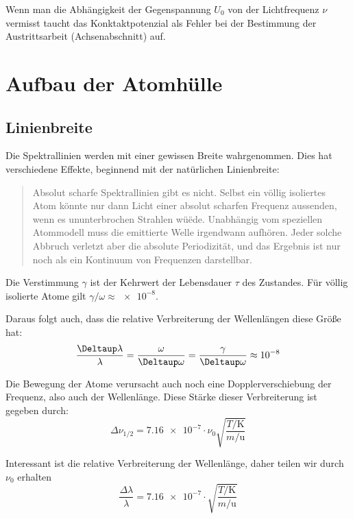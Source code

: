 Wenn man die Abhängigkeit der Gegenspannung $U_0$ von der Lichtfrequenz $\nu$
vermisst taucht das Konktaktpotenzial als Fehler bei der Bestimmung der
Austrittsarbeit (Achsenabschnitt) auf.

\section{Aufbau der Atomhülle}

\subsection{Linienbreite}

Die Spektrallinien werden mit einer gewissen Breite wahrgenommen. Dies hat
verschiedene Effekte, beginnend mit der natürlichen Linienbreite:

\begin{quote}
    Absolut scharfe Spektrallinien gibt es nicht. Selbst ein völlig isoliertes
    Atom könnte nur dann Licht einer absolut scharfen Frequenz aussenden, wenn
    es ununterbrochen Strahlen wüëde. Unabhängig vom speziellen Atommodell muss
    die emittierte Welle irgendwann aufhören. Jeder solche Abbruch verletzt
    aber die absolute Periodizität, und das Ergebnis ist nur noch als ein
    Kontinuum von Frequenzen darstellbar.
    \parencite[Abschnitt~14.3.2]{meschede-gerthsen_24}
\end{quote}

Die Verstimmung $\gamma$ ist der Kehrwert der Lebensdauer $\tau$ des Zustandes.
Für völlig isolierte Atome gilt $\gamma / \omega \approx \num{e-8}$.
\parencite[Abschnitt~14.3.2]{meschede-gerthsen_24}

Daraus folgt auch, dass die relative Verbreiterung der Wellenlängen diese Größe
hat:
\[
    \frac{\Deltaup \lambda}{\lambda}
    = \frac{\omega}{\Deltaup \omega}
    = \frac{\gamma}{\Deltaup \omega}
    \approx \num{e-8}
\]

Die Bewegung der Atome verursacht auch noch eine Dopplerverschiebung der
Frequenz, also auch der Wellenlänge. Diese Stärke dieser Verbreiterung ist
gegeben durch: \parencite{chemgapedia/spektrallinien/dopplerverbreiterung}
\[
    \Delta \nu_{1/2} = \num{7.16e-7} \cdot \nu_0
    \sqrt{\frac{T/\si\kelvin}{m/\si\atomicmassunit}}
\]

Interessant ist die relative Verbreiterung der Wellenlänge, daher teilen wir
durch $\nu_0$ erhalten
\begin{equation}
    \label{eq:dopplerverbreiterung}
    \frac{\Delta\lambda}\lambda = \num{7.16e-7} \cdot
    \sqrt{\frac{T/\si\kelvin}{m/\si\atomicmassunit}}
\end{equation}

